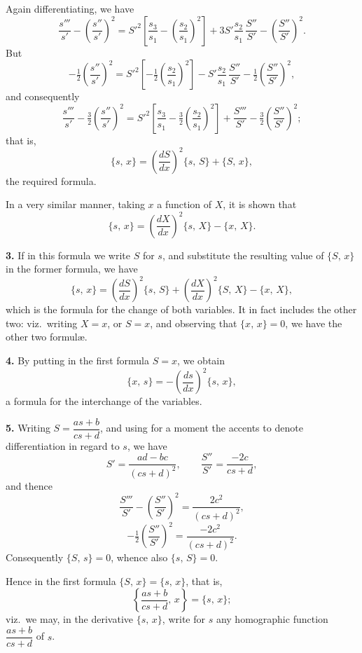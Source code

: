 \documentclass[11pt]{article}
\newcommand{\artno}[1]{\textbf{#1.}\quad}
\begin{document}

Again differentiating, we have
\[
   \frac{s'''}{s'} - \left(\frac{s''}{s'}\right)^{\!2}
   = S'^{2}\!\left[\frac{s_{3}}{s_{1}} - \left(\frac{s_{2}}{s_{1}}\right)^{\!2}\right]
   + 3S'\frac{s_{2}}{s_{1}}\,\frac{S''}{S'} - \left(\frac{S''}{S'}\right)^{\!2}.
\]
But
\[
   -\tfrac{1}{2}\!\left(\frac{s''}{s'}\right)^{\!2} = S'^{2}\!\left[-\tfrac{1}{2}\!\left(\frac{s_{2}}{s_{1}}\right)^{\!2}\right] - S'\frac{s_{2}}{s_{1}}\,\frac{S''}{S'} - \tfrac{1}{2}\!\left(\frac{S''}{S'}\right)^{\!2},
\]
and consequently
\[
   \frac{s'''}{s'} - \tfrac{3}{2}\!\left(\frac{s''}{s'}\right)^{\!2}
   = S'^{2}\!\left[\frac{s_{3}}{s_{1}} - \tfrac{3}{2}\!\left(\frac{s_{2}}{s_{1}}\right)^{\!2}\right]
   + \frac{S'''}{S'} - \tfrac{3}{2}\!\left(\frac{S''}{S'}\right)^{\!2};
\]
that is,
\[
   \{s,\,x\} = \left(\frac{dS}{dx}\right)^{\!2}\{s,\,S\} + \{S,\,x\},
\]
the required formula.

In a very similar manner, taking $x$ a function of $X$, it is shown that
\[
   \{s,\,x\} = \left(\frac{dX}{dx}\right)^{\!2}\{s,\,X\} - \{x,\,X\}.
\]

\artno{3} If in this formula we write $S$ for $s$, and substitute the resulting value of
$\{S,\,x\}$ in the former formula, we have
\[
   \{s,\,x\} = \left(\frac{dS}{dx}\right)^{\!2}\{s,\,S\} + \left(\frac{dX}{dx}\right)^{\!2}\{S,\,X\} - \{x,\,X\},
\]
which is the formula for the change of both variables. It in fact includes the other
two: viz.\ writing $X = x$, or $S = x$, and observing that $\{x,\,x\} = 0$, we have the
other two formul\ae.

\artno{4} By putting in the first formula $S = x$, we obtain
\[
   \{x,\,s\} = -\left(\frac{ds}{dx}\right)^{\!2}\{s,\,x\},
\]
a formula for the interchange of the variables.

\artno{5} Writing $S = \dfrac{as+b}{cs+d}$, and using for a moment the accents to denote differentiation
in regard to $s$, we have
\[
   S' = \frac{ad-bc}{(cs+d)^{2}}, \qquad \frac{S''}{S'} = \frac{-2c}{cs+d},
\]
and thence
\[
   \frac{S'''}{S'} - \left(\frac{S''}{S'}\right)^{\!2} = \frac{2c^{2}}{(cs+d)^{2}},
\]
\[
   -\tfrac{1}{2}\!\left(\frac{S''}{S'}\right)^{\!2} = \frac{-2c^{2}}{(cs+d)^{2}}.
\]
Consequently $\{S,\,s\} = 0$, whence also $\{s,\,S\} = 0$.

\newpage
Hence in the first formula $\{S,\,x\} = \{s,\,x\}$, that is,
\[
   \left\{\frac{as+b}{cs+d},\,x\right\} = \{s,\,x\};
\]
viz.\ we may, in the derivative $\{s,\,x\}$, write for $s$ any homographic function $\dfrac{as+b}{cs+d}$
of $s$.
\end{document}
